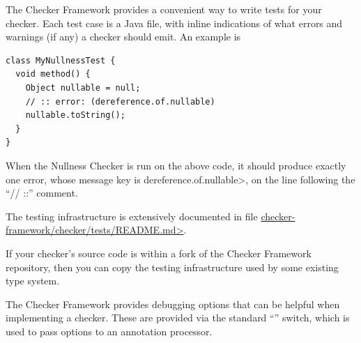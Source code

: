 
The Checker Framework provides a convenient way to write tests for your
checker.  Each test case is a Java file, with inline indications of what
errors and warnings (if any) a checker should emit.  An example is

\begin{Verbatim}
class MyNullnessTest {
  void method() {
    Object nullable = null;
    // :: error: (dereference.of.nullable)
    nullable.toString();
  }
}
\end{Verbatim}

\noindent
When the Nullness Checker is run on the above code, it should produce
exactly one error, whose message key is \<dereference.of.nullable>, on
the line following the ``// ::'' comment.

The testing infrastructure is extensively documented in file \href{https://github.com/typetools/checker-framework/blob/master/checker/tests/README.md}{\<checker-framework/checker/tests/README.md>}.

If your checker's source code is within a fork of the Checker Framework
repository, then you can copy the testing infrastructure used by some
existing type system.



The Checker Framework provides debugging options that can be helpful when
implementing a checker. These are provided via the standard  ``''
switch, which is used to pass options to an annotation processor.



